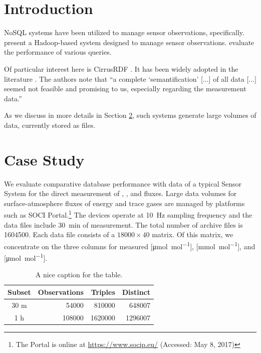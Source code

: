 \documentclass[preprint,12pt,authoryear]{elsarticle}
\begin{document}

\section{Introduction}
\label{s:introduction}
NoSQL systems have been utilized to manage sensor observations, specifically. \citet{wang14hdsw} present a Hadoop-based system designed to manage sensor observations. \citeauthor{wang14hdsw} evaluate the performance of various queries. 

Of particular interest here is CirrusRDF \citep{ladwig11cirrusrdf}. It has been widely adopted in the literature \citep{lefort12qb,phuoc11linked,mueller13restful}. The authors note that ``a complete `semantification' [...] of all data [...] seemed not feasible and promising to us, especially regarding the measurement data.'' 

As we discuss in more details in Section \ref{s:case-study}, such systems generate large volumes of data, currently stored as files.

\section{Case Study}
\label{s:case-study}
We evaluate comparative database performance with data of a typical Sensor System for the direct measurement of , , and  fluxes. Large data volumes for surface-atmosphere fluxes of energy and trace gases are managed by platforms such as SOCI Portal.\footnote{The Portal is online at \url{https://www.socip.eu/} (Accessed: May 8, 2017)} The devices operate at \SI{10}{\hertz} sampling frequency and the data files include \SI{30}{\minute} of measurement. The total number of archive files is \num{1604500}. Each data file consists of a $\num{18000} \times 40$ matrix. Of this matrix, we concentrate on the three columns for measured  [\si{\micro\mol\per\mol}],  [\si{\milli\mol\per\mol}], and  [\si{\micro\mol\per\mol}].

\begin{table}
	\centering
	\caption{A nice caption for the table.}
	\begin{tabular}{|c|r|r|r|}
		\hline
		Subset & Observations & Triples & Distinct \\
		\hline
		30 m & \num{54000} & \num{810000} & \num{648007} \\
		1 h & \num{108000} & \num{1620000} & \num{1296007} \\
		\hline 
	\end{tabular}
	\label{tbl:size-summary}
\end{table}
\end{document}
